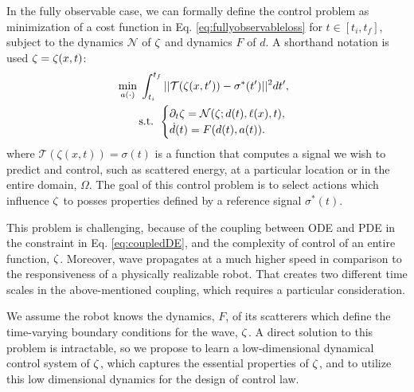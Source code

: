 


In the fully observable case, we can formally define the control problem as minimization of a cost function in Eq. \eqref{eq:fullyobservableloss} for $t\in [t_i, t_f]$, subject to the dynamics $\mathcal{N}$ of $\zeta$ and dynamics $F$ of $d$. A shorthand notation is used $\zeta = \zeta(x, t)$:
\begin{align}    
    &\min_{a(\cdot)}\;
    \int_{t_i}^{t_f}||\mathcal{T}(\zeta(x, t')) - \sigma^*(t')||^2dt' \label{eq:fullyobservableloss}, \\
    &\qquad\mbox{s.t. }
    \begin{cases}
        \partial_t\zeta = \mathcal{N}(\zeta; d(t), \ell(x), t),\\
        \dot{d}(t) = F(d(t), a(t)).
    \end{cases}\label{eq:coupledDE}
\end{align}
where $\mathcal{T}(\zeta(x,t))=\sigma(t)$ is a function that computes a signal we wish to predict and control, such as scattered energy, at a particular location or in the entire domain, $\Omega$. The goal of this control problem is to select actions which influence $\zeta$ to posses properties defined by a reference signal $\sigma^*(t)$.

This problem is challenging, because of the coupling between ODE and PDE in the constraint in Eq. \eqref{eq:coupledDE}, and the complexity of control of an entire function, $\zeta$. Moreover, wave propagates at a much higher speed in comparison to the responsiveness of a physically realizable robot. That creates two different time scales in the above-mentioned coupling, which requires a particular consideration.   

We assume the robot knows the dynamics, $F$, of its scatterers which define the time-varying boundary conditions for the wave, $\zeta$. A direct solution to this problem is intractable, so we propose to learn a low-dimensional dynamical control system of $\zeta$, which captures the essential properties of $\zeta$, and to utilize this low dimensional dynamics for the design of control law.

